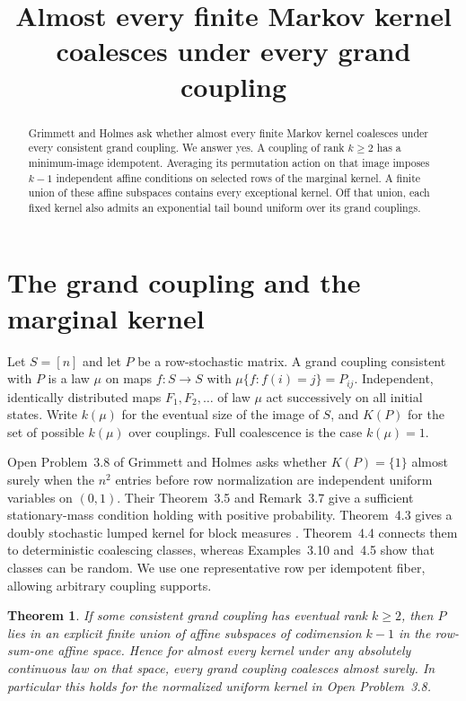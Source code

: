 \documentclass[11pt,a4paper]{amsart}
\title[Coalescence under every grand coupling]{Almost every finite Markov kernel coalesces under every grand coupling}
\date{}
\newtheorem{theorem}{Theorem}
\begin{document}
\begin{abstract}
Grimmett and Holmes ask whether almost every finite Markov kernel coalesces under every consistent grand coupling. We answer yes. A coupling of rank $k\ge2$ has a minimum-image idempotent. Averaging its permutation action on that image imposes $k-1$ independent affine conditions on selected rows of the marginal kernel. A finite union of these affine subspaces contains every exceptional kernel. Off that union, each fixed kernel also admits an exponential tail bound uniform over its grand couplings.
\end{abstract}
\maketitle

\section{The grand coupling and the marginal kernel}
Let $S=[n]$ and let $P$ be a row-stochastic matrix. A grand coupling consistent with $P$ is a law $\mu$ on maps $f:S\to S$ with $\mu\{f:f(i)=j\}=P_{ij}$. Independent, identically distributed maps $F_1,F_2,\ldots$ of law $\mu$ act successively on all initial states. Write $k(\mu)$ for the eventual size of the image of $S$, and $K(P)$ for the set of possible $k(\mu)$ over couplings. Full coalescence is the case $k(\mu)=1$.

Open Problem~3.8 of Grimmett and Holmes \cite[p.~8]{grimhol} asks whether $K(P)=\{1\}$ almost surely when the $n^2$ entries before row normalization are independent uniform variables on $(0,1)$. Their Theorem~3.5 and Remark~3.7 give a sufficient stationary-mass condition holding with positive probability. Theorem~4.3 gives a doubly stochastic lumped kernel for block measures \cite{grimhol,ghprior}. Theorem~4.4 connects them to deterministic coalescing classes, whereas Examples~3.10 and~4.5 show that classes can be random. We use one representative row per idempotent fiber, allowing arbitrary coupling supports.

\begin{theorem}\label{thm:affine}
If some consistent grand coupling has eventual rank $k\ge2$, then $P$ lies in an explicit finite union of affine subspaces of codimension $k-1$ in the row-sum-one affine space. Hence for almost every kernel under any absolutely continuous law on that space, every grand coupling coalesces almost surely. In particular this holds for the normalized uniform kernel in Open Problem~3.8.
\end{theorem}
\end{document}
